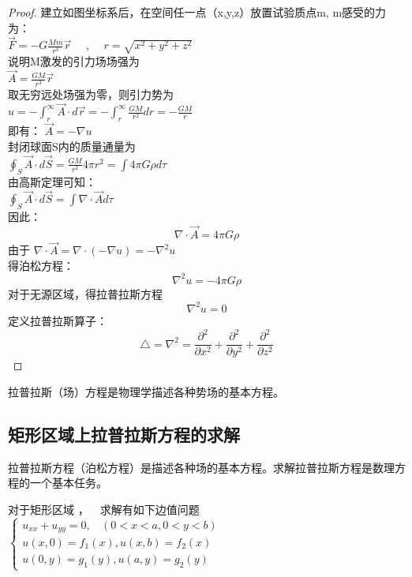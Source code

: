 \begin{proof} 
建立如图坐标系后，在空间任一点（x,y,z）放置试验质点m, m感受的力为：\\
{	$\displaystyle  \overrightarrow{F} =-G\frac{Mm}{r^3} \overrightarrow {r} $ }  ~~,~~ $r=\sqrt{x^2+y^2+z^2}$\\ 
说明M激发的引力场场强为 \\
{ $  \displaystyle  \overrightarrow{A} =\frac{GM}{r^3} \overrightarrow{r} $ }\\
取无穷远处场强为零，则引力势为\\
$\displaystyle  u = -\int_{r}^{\infty} \overrightarrow{A}\cdot d \overrightarrow{r} =- \int_{r}^{\infty} \frac{GM}{r^2} dr =- \frac{GM}{r} $ \\
即有： $\overrightarrow{A} =-\nabla u$ \\
封闭球面S内的质量通量为 \\
 $\displaystyle \oint_{S} \overrightarrow{A} \cdot d \overrightarrow{S} = \frac{GM}{r^2} 4\pi r^2 =\int  4\pi G  \rho d\tau$  \\
 由高斯定理可知：\\
 $ \displaystyle \oint_{S} \overrightarrow{A} \cdot d \overrightarrow{S} =\int  \nabla \cdot \overrightarrow{A} d\tau $\\
 因此： 
 \begin{equation*}
 	\nabla \cdot \overrightarrow{A} = 4\pi G \rho
 \end{equation*}
由于 $\nabla \cdot \overrightarrow{A} = \nabla \cdot \left(-\nabla u\right)= -\nabla ^2 u$ \\
得泊松方程：
 \begin{equation*}
\nabla ^2 u= -4\pi G \rho
\end{equation*}
 对于无源区域，得拉普拉斯方程
 \begin{equation*}
\nabla ^2  u =0 
\end{equation*}
定义拉普拉斯算子：
 \begin{equation*}
\triangle  = \nabla ^2 = \frac{\partial ^2}{\partial x^2} +\frac{\partial^2 }{\partial y^2} +\frac{\partial^2  }{\partial z^2}
\end{equation*}
\end{proof} 

\begin{remark}
拉普拉斯（场）方程是物理学描述各种势场的基本方程。
\end{remark}

\subsection{矩形区域上拉普拉斯方程的求解}
拉普拉斯方程（泊松方程）是描述各种场的基本方程。求解拉普拉斯方程是数理方程的一个基本任务。
\begin{example} %
 对于矩形区域 ，  求解有如下边值问题 \\
 $\displaystyle \begin{cases}
u_{xx} +u_{yy} =0 ,~~~~ (0<x<a, 0<y<b)\\
u(x,0)= f_1 (x) ,  u(x,b)= f_2 (x) \\
u(0,y)= g_1 (y) ,  u(a,y)= g_2 (y) 
\end{cases}$ \\
\end{example}

